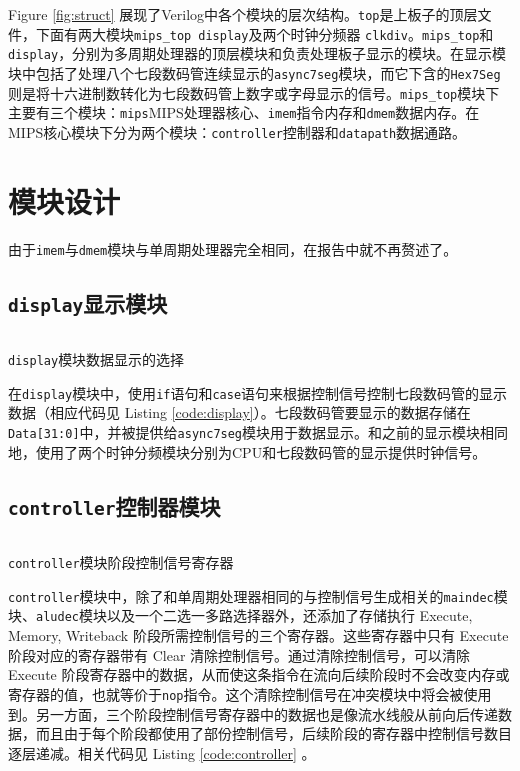 \documentclass[12pt,a4paper]{article}
\newcommand{\incode}[1]{\texttt{#1}} %
\newcommand{\codefile}[1]{\inputminted[bgcolor=bg,linenos,tabsize=4]{verilog}{code/#1}} %
\begin{document}
Figure \ref{fig:struct} 展现了Verilog中各个模块的层次结构。\incode{top}是上板子的顶层文件，下面有两大模块\incode{mips_top}\ \incode{display}及两个时钟分频器 \incode{clkdiv}。\incode{mips_top}和\incode{display}，分别为多周期处理器的顶层模块和负责处理板子显示的模块。在显示模块中包括了处理八个七段数码管连续显示的\incode{async7seg}模块，而它下含的\incode{Hex7Seg}则是将十六进制数转化为七段数码管上数字或字母显示的信号。\incode{mips_top}模块下主要有三个模块：\incode{mips}MIPS处理器核心、\incode{imem}指令内存和\incode{dmem}数据内存。在MIPS核心模块下分为两个模块：\incode{controller}控制器和\incode{datapath}数据通路。

\section{模块设计}

由于\incode{imem}与\incode{dmem}模块与单周期处理器完全相同，在报告中就不再赘述了。

\subsection{\incode{display}显示模块}

\begin{listing}[h]
	\codefile{display.v}
	\caption{\incode{display}模块数据显示的选择}
	\label{code:display}
\end{listing}

在\incode{display}模块中，使用\incode{if}语句和\incode{case}语句来根据控制信号控制七段数码管的显示数据（相应代码见 Listing \ref{code:display}）。七段数码管要显示的数据存储在\incode{Data[31:0]}中，并被提供给\incode{async7seg}模块用于数据显示。和之前的显示模块相同地，使用了两个时钟分频模块分别为CPU和七段数码管的显示提供时钟信号。

\subsection{\incode{controller}控制器模块}

\begin{listing}[htbp]
	\codefile{controller.v}
	\caption{\incode{controller}模块阶段控制信号寄存器}
	\label{code:controller}
\end{listing}

\incode{controller}模块中，除了和单周期处理器相同的与控制信号生成相关的\incode{maindec}模块、\incode{aludec}模块以及一个二选一多路选择器外，还添加了存储执行 Execute, Memory, Writeback 阶段所需控制信号的三个寄存器。这些寄存器中只有 Execute 阶段对应的寄存器带有 Clear 清除控制信号。通过清除控制信号，可以清除 Execute 阶段寄存器中的数据，从而使这条指令在流向后续阶段时不会改变内存或寄存器的值，也就等价于\incode{nop}指令。这个清除控制信号在冲突模块中将会被使用到。另一方面，三个阶段控制信号寄存器中的数据也是像流水线般从前向后传递数据，而且由于每个阶段都使用了部份控制信号，后续阶段的寄存器中控制信号数目逐层递减。相关代码见 Listing \ref{code:controller} 。
\end{document}
